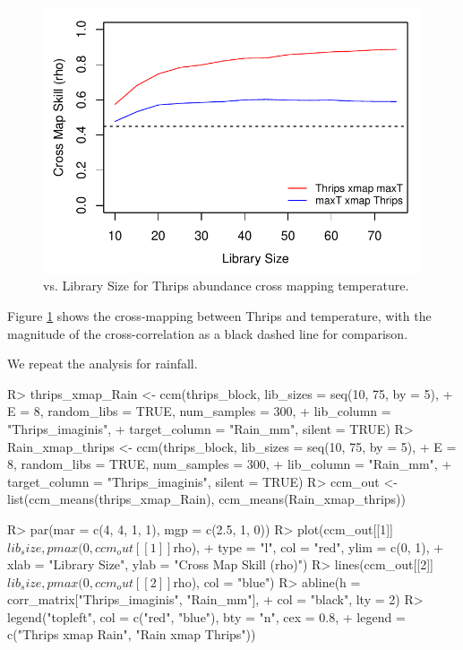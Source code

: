 \documentclass[article]{jss}
\begin{document}
\begin{figure}[t!]
\begin{center}
\includegraphics[width=5in]{article-thrips-temp-ccm}
\end{center}
\caption{\label{fig:thrips-temp-ccm}  vs. Library Size for Thrips abundance cross mapping temperature.}
\end{figure}

Figure \ref{fig:thrips-temp-ccm} shows the cross-mapping between Thrips and temperature, with the magnitude of the cross-correlation as a black dashed line for comparison.

We repeat the analysis for rainfall.

\begin{Schunk}
\begin{Sinput}
R> thrips_xmap_Rain <- ccm(thrips_block, lib_sizes = seq(10, 75, by = 5), 
+                          E = 8, random_libs = TRUE, num_samples = 300, 
+                          lib_column = "Thrips_imaginis", 
+                          target_column = "Rain_mm", silent = TRUE)
R> Rain_xmap_thrips <- ccm(thrips_block, lib_sizes = seq(10, 75, by = 5), 
+                          E = 8, random_libs = TRUE, num_samples = 300, 
+                          lib_column = "Rain_mm", 
+                          target_column = "Thrips_imaginis", silent = TRUE)
R> ccm_out <- list(ccm_means(thrips_xmap_Rain), ccm_means(Rain_xmap_thrips))
\end{Sinput}
\end{Schunk}

\begin{Schunk}
\begin{Sinput}
R> par(mar = c(4, 4, 1, 1), mgp = c(2.5, 1, 0))
R> plot(ccm_out[[1]]$lib_size, pmax(0, ccm_out[[1]]$rho), 
+       type = "l", col = "red", ylim = c(0, 1),
+       xlab = "Library Size", ylab = "Cross Map Skill (rho)")
R> lines(ccm_out[[2]]$lib_size, pmax(0, ccm_out[[2]]$rho), col = "blue")
R> abline(h = corr_matrix["Thrips_imaginis", "Rain_mm"], 
+         col = "black", lty = 2)
R> legend("topleft", col = c("red", "blue"), bty = "n", cex = 0.8, 
+         legend = c("Thrips xmap Rain", "Rain xmap Thrips"))
\end{Sinput}
\end{Schunk}
\end{document}
